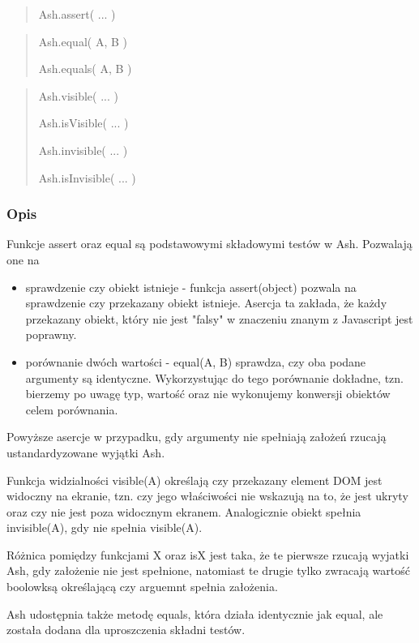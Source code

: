 \documentclass[brudnopis]{xmgr}
\begin{document}
\begin{quote}
Ash.assert( ... ) 
\end{quote}

\begin{quote}
Ash.equal( A, B )

Ash.equals( A, B ) 
\end{quote}

\begin{quote}
Ash.visible( ... ) 

Ash.isVisible( ... )

Ash.invisible( ... )

Ash.isInvisible( ... )
\end{quote}

\subsubsection{Opis}

Funkcje assert oraz equal są podstawowymi składowymi testów w Ash. Pozwalają one na 

\begin{itemize}
  \item sprawdzenie czy obiekt istnieje - funkcja assert(object) pozwala na sprawdzenie czy przekazany obiekt istnieje. Asercja ta zakłada, że każdy przekazany obiekt, który nie jest "falsy" w znaczeniu znanym z Javascript jest poprawny. 
  \item porównanie dwóch wartości - equal(A, B) sprawdza, czy oba podane argumenty są identyczne. Wykorzystując do tego porównanie dokładne, tzn. bierzemy po uwagę typ, wartość oraz nie wykonujemy konwersji obiektów celem porównania.
\end{itemize}
Powyższe asercje w przypadku, gdy argumenty nie spełniają założeń rzucają ustandardyzowane wyjątki Ash. 

Funkcja widzialności visible(A) określają czy przekazany element DOM jest widoczny na ekranie, tzn. czy jego właściwości nie wskazują na to, że jest ukryty oraz czy nie jest poza widocznym ekranem. Analogicznie obiekt spełnia invisible(A), gdy nie spełnia visible(A). 

Różnica pomiędzy funkcjami X oraz isX jest taka, że te pierwsze rzucają wyjatki Ash, gdy założenie nie jest spełnione, natomiast te drugie tylko zwracają wartość boolowksą określającą czy arguemnt spełnia założenia.  

Ash udostępnia także metodę equals, która działa identycznie jak equal, ale została dodana dla uproszczenia składni testów.
\end{document}
